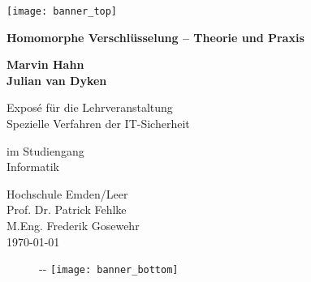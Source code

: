 
\begin{titlepage}
    
    \begin{flushright}
        \texttt{[image: banner\_top]}
    \end{flushright}

    \begin{flushleft}
        \vspace*{1.5cm}
        \Huge
        \textbf{Homomorphe Verschlüsselung – Theorie und Praxis}
        
        \vspace{1.5cm}
        \textbf{Marvin Hahn}\\
        \textbf{Julian van Dyken}
        
        \vspace{0.5cm}
        \Large
        Exposé für die Lehrveranstaltung\\
        Spezielle Verfahren der IT-Sicherheit
        
        \vspace{0.5cm}
        im Studiengang\\
        Informatik
        
    \end{flushleft}        

    \vspace{0.5cm}
    \begin{flushright}
        Hochschule Emden/Leer\\
        Prof. Dr. Patrick Fehlke\\
        M.Eng. Frederik Gosewehr\\
        \vspace{1em}
        \today
    \end{flushright}   
    
    \begin{figure}[b]
        \begin{adjustwidth}{-\oddsidemargin-1in}{-\rightmargin}
            \centering
            \texttt{[image: banner\_bottom]}
        \end{adjustwidth}
    \end{figure}

\end{titlepage}

\restoregeometry